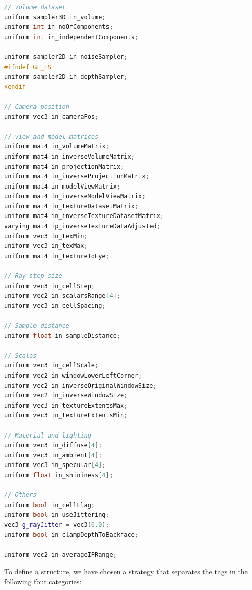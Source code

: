 \begin{lstlisting}[language=C++, caption={Base declaration fragment code},
                   captionpos=b, frame=single, breaklines=true,
                   label=lst:basedeclshader]
// Volume dataset
uniform sampler3D in_volume;
uniform int in_noOfComponents;
uniform int in_independentComponents;

uniform sampler2D in_noiseSampler;
#ifndef GL_ES
uniform sampler2D in_depthSampler;
#endif

// Camera position
uniform vec3 in_cameraPos;

// view and model matrices
uniform mat4 in_volumeMatrix;
uniform mat4 in_inverseVolumeMatrix;
uniform mat4 in_projectionMatrix;
uniform mat4 in_inverseProjectionMatrix;
uniform mat4 in_modelViewMatrix;
uniform mat4 in_inverseModelViewMatrix;
uniform mat4 in_textureDatasetMatrix;
uniform mat4 in_inverseTextureDatasetMatrix;
varying mat4 ip_inverseTextureDataAdjusted;
uniform vec3 in_texMin;
uniform vec3 in_texMax;
uniform mat4 in_textureToEye;

// Ray step size
uniform vec3 in_cellStep;
uniform vec2 in_scalarsRange[4];
uniform vec3 in_cellSpacing;

// Sample distance
uniform float in_sampleDistance;

// Scales
uniform vec3 in_cellScale;
uniform vec2 in_windowLowerLeftCorner;
uniform vec2 in_inverseOriginalWindowSize;
uniform vec2 in_inverseWindowSize;
uniform vec3 in_textureExtentsMax;
uniform vec3 in_textureExtentsMin;

// Material and lighting
uniform vec3 in_diffuse[4];
uniform vec3 in_ambient[4];
uniform vec3 in_specular[4];
uniform float in_shininess[4];

// Others
uniform bool in_cellFlag;
uniform bool in_useJittering;
vec3 g_rayJitter = vec3(0.0);
uniform bool in_clampDepthToBackface;

uniform vec2 in_averageIPRange;
\end{lstlisting}

To define a structure, we have chosen a strategy that separates the tags in
the following four categories:

